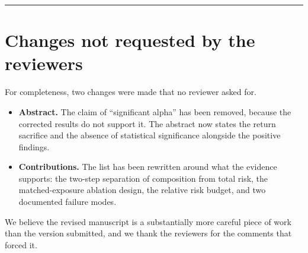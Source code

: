 \documentclass[11pt,a4paper]{article}
\begin{document}
\bigskip
\hrule
\section*{Changes not requested by the reviewers}

For completeness, two changes were made that no reviewer asked for.

\begin{itemize}
\item \textbf{Abstract.} The claim of ``significant alpha'' has been removed, because the
corrected results do not support it. The abstract now states the return sacrifice and
the absence of statistical significance alongside the positive findings.
\item \textbf{Contributions.} The list has been rewritten around what the evidence
supports: the two-step separation of composition from total risk, the matched-exposure
ablation design, the relative risk budget, and two documented failure modes.
\end{itemize}

We believe the revised manuscript is a substantially more careful piece of work than the
version submitted, and we thank the reviewers for the comments that forced it.
\end{document}
